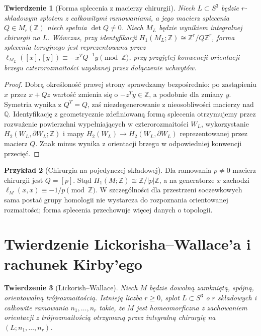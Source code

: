 \documentclass[11pt,a4paper]{report}
\numberwithin{equation}{section}
\theoremstyle{plain}
\newtheorem{twierdzenie}{Twierdzenie}[section]
\theoremstyle{definition}
\newtheorem{przyklad}[twierdzenie]{Przykład}
\theoremstyle{remark}
\begin{document}
\begin{twierdzenie}[Forma splecenia z macierzy chirurgii]
Niech $L\subset S^3$ będzie $r$-składowym splotem z
całkowitymi ramowaniami, a jego macierz splecenia
$Q\in M_r(\mathbb Z)$ niech spełnia $\det Q\ne0$.
Niech $M_L$ będzie wynikiem integralnej chirurgii na $L$.
Wówczas, przy identyfikacji
$H_1(M_L;\mathbb Z)\cong\mathbb Z^r/Q\mathbb Z^r$,
forma splecenia torsyjnego jest reprezentowana przez
$\ell_{M_L}([x],[y])\equiv -x^TQ^{-1}y\pmod{\mathbb Z}$,
przy przyjętej konwencji orientacji brzegu czterorozmaitości
uzyskanej przez dołączenie uchwytów.
\end{twierdzenie}

\begin{proof}
Dobrą określoność prawej strony sprawdzamy bezpośrednio:
po zastąpieniu $x$ przez $x+Qz$ wartość zmienia się
o $-z^Ty\in\mathbb Z$, a podobnie dla zmiany $y$.
Symetria wynika z $Q^T=Q$, zaś niezdegenerowanie
z nieosobliwości macierzy nad $\mathbb Q$.
Identyfikację z geometrycznie zdefiniowaną formą splecenia
otrzymujemy przez rozważenie powierzchni wypełniających
w czterorozmaitości $W_L$, wykorzystanie
$H_2(W_L,\partial W_L;\mathbb Z)$ i mapy
$H_2(W_L)\to H_2(W_L,\partial W_L)$ reprezentowanej
przez macierz $Q$. Znak minus wynika z orientacji
brzegu w odpowiedniej konwencji przecięć.
\end{proof}

\begin{przyklad}[Chirurgia na pojedynczej składowej]
Dla ramowania $p\ne0$ macierz chirurgii jest $Q=[p]$.
Stąd $H_1(M;\mathbb Z)\cong\mathbb Z/|p|\mathbb Z$,
a na generatorze $x$ zachodzi
$\ell_M(x,x)\equiv-1/p\pmod{\mathbb Z}$.
W szczególności dla przestrzeni soczewkowych sama
postać grupy homologii nie wystarcza do rozpoznania
orientowanej rozmaitości; forma splecenia przechowuje
więcej danych o topologii.
\end{przyklad}


\section{Twierdzenie Lickorisha--Wallace'a i rachunek Kirby'ego}
\label{sec:kt-wallace}

\begin{twierdzenie}[Lickorish--Wallace]
Niech $M$ będzie dowolną zamkniętą, spójną, orientowalną
trójrozmaitością. Istnieją liczba $r\geq0$, splot
$L\subset S^3$ o $r$ składowych i całkowite ramowania
$n_1,\dots,n_r$ takie, że $M$ jest homeomorficzna z zachowaniem orientacji
z trójrozmaitością otrzymaną przez integralną chirurgię
na $(L;n_1,\dots,n_r)$.
\end{twierdzenie}
\end{document}
